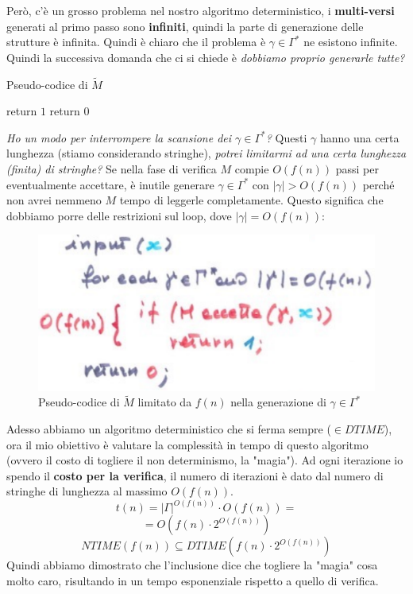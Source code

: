 \documentclass{article}
\begin{document}
Però, c'è un grosso problema nel nostro algoritmo deterministico, i \textbf{multi-versi} generati
al primo passo sono \textbf{infiniti}, quindi la parte di generazione delle strutture è infinita.
\newline\newline
Quindi è chiaro che il problema è $\gamma\in\Gamma^*$ ne esistono infinite. Quindi la
successiva domanda che ci si chiede è \textit{dobbiamo proprio generarle tutte?}
\begin{algorithm}[hbt!]
    \caption{Pseudo-codice di $\tilde{M}$}\label{alg:tilde-m}
    \ForEach{$(\gamma\in\Gamma^*)$}
    {
        {
            return $1$\;
        }
    }
    return $0$\;
\end{algorithm}
\textit{Ho un modo per interrompere la scansione dei $\gamma\in\Gamma^*$?} Questi $\gamma$
hanno una certa lunghezza (stiamo considerando stringhe), \textit{potrei limitarmi ad
    una certa lunghezza (finita) di stringhe?} Se nella fase di verifica $M$ compie $O(f(n))$
passi per eventualmente accettare, è inutile generare $\gamma\in\Gamma^*$ con $|\gamma|>O(f(n))$
perché non avrei nemmeno $M$ tempo di leggerle completamente.
Questo significa che dobbiamo porre delle restrizioni sul loop, dove $|\gamma|=O(f(n))$:
\begin{figure}[H]
    \centering
    \includegraphics[scale=0.5]{images/pseudtoDTM_tilde_corretto.png}
    \caption{Pseudo-codice di $\tilde{M}$ limitato da $f(n)$ nella generazione di $\gamma\in\Gamma^*$}
\end{figure}
Adesso abbiamo un algoritmo deterministico che si ferma sempre ($\in DTIME$), ora il mio
obiettivo è valutare la complessità in tempo di questo algoritmo (ovvero il costo
di togliere il non determinismo, la "magia").
Ad ogni iterazione io spendo il \textbf{costo per la verifica},
il numero di iterazioni è dato dal numero di stringhe di lunghezza al massimo $O\left(f(n)\right)$.
$$t(n)=|\Gamma|^{O(f(n))}\cdot O\left(f(n)\right)=$$
$$=O\left(f(n)\cdot 2^{O\left(f(n)\right)}\right)$$
$$NTIME \left(f(n)\right)\subseteq DTIME\left(f(n)\cdot 2^{O(f(n))}\right)$$
Quindi abbiamo dimostrato che l'inclusione dice che togliere la "magia" cosa molto caro,
risultando in un tempo esponenziale rispetto a quello di verifica.
\end{document}
